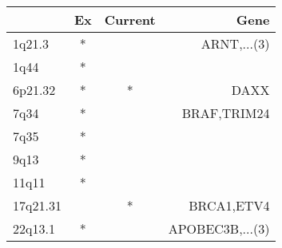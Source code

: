 \begin{tabular}{lccr}
\toprule
{} & Ex & Current &             Gene \\
\midrule
1q21.3   &  * &         &      ARNT,...(3) \\
1q44     &  * &         &                  \\
6p21.32  &  * &       * &             DAXX \\
7q34     &  * &         &      BRAF,TRIM24 \\
7q35     &  * &         &                  \\
9q13     &  * &         &                  \\
11q11    &  * &         &                  \\
17q21.31 &    &       * &       BRCA1,ETV4 \\
22q13.1  &  * &         &  APOBEC3B,...(3) \\
\bottomrule
\end{tabular}
